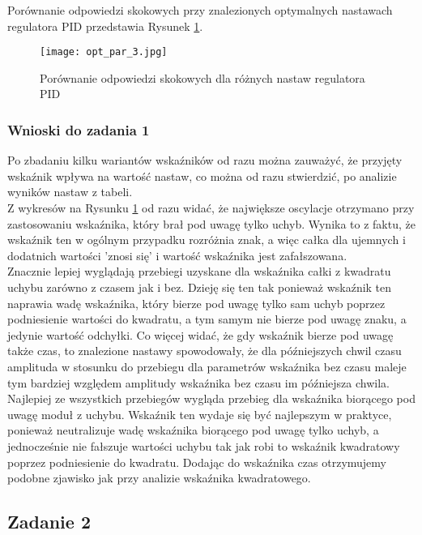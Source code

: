 \documentclass[a4paper,11pt]{article}
\begin{document}
Porównanie odpowiedzi skokowych przy znalezionych optymalnych nastawach regulatora PID przedstawia Rysunek \ref{fig:opt_par_3}.

\begin{figure}[H]
\centerline{\texttt{[image: opt\_par\_3.jpg]}}
\caption{Porównanie odpowiedzi skokowych dla różnych nastaw regulatora PID}
\label{fig:opt_par_3}
\end{figure}

\newpage
\subsubsection{Wnioski do zadania 1}
Po zbadaniu kilku wariantów wskaźników od razu można zauważyć, że przyjęty wskaźnik wpływa na wartość nastaw, co można od razu stwierdzić, po analizie wyników nastaw z tabeli. \\

Z wykresów na Rysunku \ref{fig:opt_par_3} od razu widać, że największe oscylacje otrzymano przy zastosowaniu wskaźnika, który brał pod uwagę tylko uchyb. Wynika to z faktu, że wskaźnik ten w ogólnym  przypadku rozróżnia znak, a więc całka dla ujemnych i dodatnich wartości 'znosi się' i wartość wskaźnika jest zafałszowana.  \\

Znacznie lepiej wyglądają przebiegi uzyskane dla wskaźnika całki z kwadratu uchybu zarówno z czasem jak i bez. Dzieję się ten tak ponieważ wskaźnik ten naprawia wadę wskaźnika, który bierze pod uwagę tylko sam uchyb poprzez podniesienie wartości do kwadratu, a tym samym nie bierze pod uwagę znaku, a jedynie wartość odchyłki. Co więcej widać, że gdy wskaźnik bierze pod uwagę także czas, to znalezione nastawy spowodowały, że dla późniejszych chwil czasu amplituda w stosunku do przebiegu dla parametrów wskaźnika bez czasu maleje tym bardziej względem amplitudy wskaźnika bez czasu im późniejsza chwila.   \\

Najlepiej ze wszystkich przebiegów wygląda przebieg dla wskaźnika biorącego pod uwagę moduł z uchybu. Wskaźnik ten wydaje się być najlepszym w praktyce, ponieważ neutralizuje wadę wskaźnika biorącego pod uwagę tylko uchyb, a jednocześnie nie fałszuje wartości uchybu tak jak robi to wskaźnik kwadratowy poprzez podniesienie do kwadratu. Dodając do wskaźnika czas otrzymujemy podobne zjawisko jak przy analizie wskaźnika kwadratowego. 

\subsection{Zadanie 2}
\end{document}
